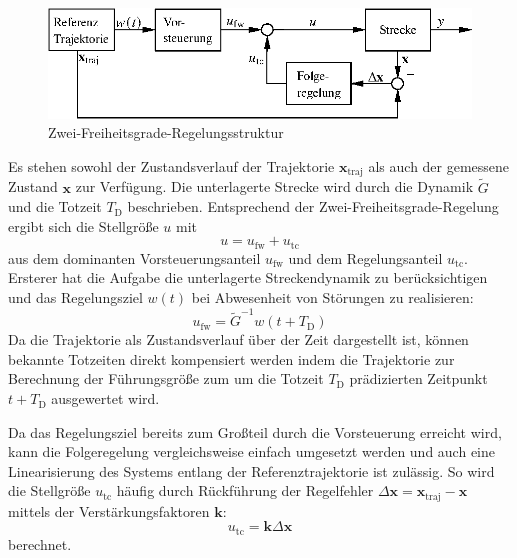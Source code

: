 \begin{figure}[htp!]
\centering
\includegraphics{Bilder/04/2DOF.eps}
\caption{Zwei-Freiheitsgrade-Regelungsstruktur}
\label{fig:2DOF}
\end{figure}

Es stehen sowohl der Zustandsverlauf der Trajektorie $\mathbf{x}_\mathrm{traj}$ als auch der gemessene Zustand $\mathbf{x}$ zur Verfügung.  Die unterlagerte Strecke wird durch die Dynamik $\tilde G$ und die Totzeit $T_\mathrm{D}$ beschrieben.  Entsprechend der Zwei-Freiheitsgrade-Regelung ergibt sich die Stellgröße $u$ mit 
\begin{equation}
u=u_\mathrm{fw}+u_\mathrm{tc}
\end{equation}
aus dem dominanten Vorsteuerungsanteil $u_\mathrm{fw}$ und dem Regelungsanteil $u_\mathrm{tc}$.  Ersterer hat die Aufgabe die unterlagerte Streckendynamik zu berücksichtigen und das Regelungsziel $w(t)$ bei Abwesenheit von Störungen zu realisieren:
\begin{equation}
u_\mathrm{fw} =  \tilde G^{-1} w(t+T_\mathrm{D})
\label{eq_u_ffw}
\end{equation}
Da die Trajektorie als Zustandsverlauf über der Zeit dargestellt ist, können bekannte Totzeiten direkt kompensiert werden indem die Trajektorie zur Berechnung der Führungsgröße zum um die Totzeit $T_\mathrm{D}$ prädizierten Zeitpunkt $t+T_\mathrm{D}$ ausgewertet wird.  

Da das Regelungsziel bereits zum Großteil durch die Vorsteuerung erreicht wird,  kann die Folgeregelung vergleichsweise einfach umgesetzt werden und auch eine Linearisierung des Systems entlang der Referenztrajektorie ist zulässig.  So wird die Stellgröße $u_\mathrm{tc}$ häufig durch Rückführung der Regelfehler $\Delta \mathbf{x} =  \mathbf{x}_\mathrm{traj}- \mathbf{x}$ mittels der Verstärkungsfaktoren $\mathbf{k}$:
\begin{equation}
u_\mathrm{tc} = \mathbf{k} \Delta \mathbf{x}
\end{equation}
berechnet.

